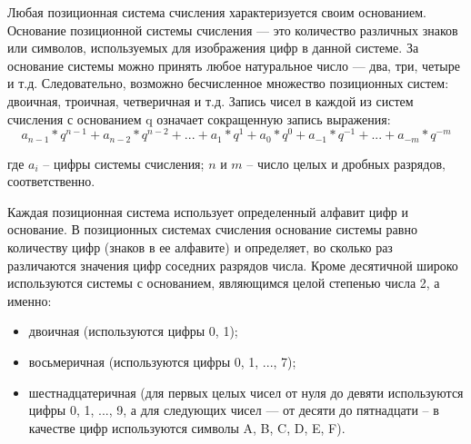 \documentclass[a4paper]{article}
\begin{document}
Любая позиционная система счисления характеризуется своим основанием. Основание позиционной системы счисления — это количество различных знаков или символов, используемых для изображения цифр в данной системе. За основание системы можно принять любое натуральное число — два, три, четыре и т.д. Следовательно, возможно бесчисленное множество позиционных систем: двоичная, троичная, четверичная и т.д. Запись чисел в каждой из систем счисления с основанием q означает сокращенную запись выражения:
\begin{equation}
  a_{n-1} * q^{n-1} + a_{n-2}* q^{n-2} + ... + a_{1}* q^{1} + a_{0}*q^{0} + a_{-1}*q^{-1} + ... + a_{-m} * q^{-m}
\end{equation}
\begin{center}
  где $a_{i}$ – цифры системы счисления; $n$ и $m$ – число целых и дробных разрядов, соответственно.
\end{center}
Каждая позиционная система использует определенный алфавит цифр и основание. В позиционных системах счисления основание системы равно количеству цифр (знаков в ее алфавите) и определяет, во сколько раз различаются значения цифр соседних разрядов числа.
Кроме десятичной широко используются системы с основанием, являющимся целой степенью числа 2, а именно:
\begin{itemize}
  \item двоичная (используются цифры 0, 1);
  \item восьмеричная (используются цифры 0, 1, ..., 7);
  \item шестнадцатеричная (для первых целых чисел от нуля до девяти используются цифры 0, 1, ..., 9, а для следующих чисел — от десяти до пятнадцати – в качестве цифр используются символы A, B, C, D, E, F).
\end{itemize}
\end{document}
